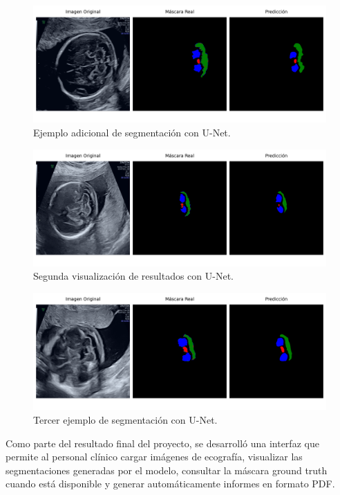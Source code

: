 \begin{figure}[h]
    \centering
    \includegraphics[width=1\textwidth]{img/image2_unet.png}
    \caption{Ejemplo adicional de segmentación con U-Net.}
    \label{fig:comparacion_unet2}
\end{figure}

\begin{figure}[h]
    \centering
    \includegraphics[width=1\textwidth]{img/image3_unet.png}
    \caption{Segunda visualización de resultados con U-Net.}
    \label{fig:comparacion_unet3}
\end{figure}

\begin{figure}[h]
    \centering
    \includegraphics[width=1\textwidth]{img/image4_unet.png}
    \caption{Tercer ejemplo de segmentación con U-Net.}
    \label{fig:comparacion_unet4}
\end{figure}

Como parte del resultado final del proyecto, se desarrolló una interfaz que permite al personal clínico cargar imágenes de ecografía, visualizar las segmentaciones generadas por el modelo, consultar la máscara ground truth cuando está disponible y generar automáticamente informes en formato PDF.

